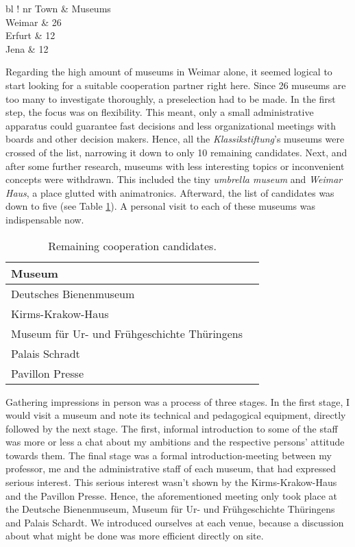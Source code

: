 \begin{table}[h]
	\centering
	\begin{tabular}{ bl !{\vrule width 1pt} nr }
		\rowstyle{\bfseries}
		Town		& Museums \\
		\toprule
		Weimar	& 26 \\ 
		Erfurt 	& 12 \\ 
		Jena 		& 12 \\ 
	\end{tabular}
	\caption{Museums in and around Weimar.}
	\label{tab:museums_amounts}
\end{table}

Regarding the high amount of museums in Weimar alone, it seemed logical to start looking for a suitable cooperation partner right here. Since 26 museums are too many to investigate thoroughly, a preselection had to be made. In the first step, the focus was on flexibility. This meant, only a small administrative apparatus could guarantee fast decisions and less organizational meetings with boards and other decision makers. Hence, all the \textit{Klassikstiftung}'s museums were crossed of the list, narrowing it down to only 10 remaining candidates. Next, and after some further research, museums with less interesting topics or inconvenient concepts were withdrawn. This included the tiny \textit{umbrella museum} and \textit{Weimar Haus}, a place glutted with animatronics. Afterward, the list of candidates was down to five (see Table \ref{tab:museums_finalists}). A personal visit to each of these museums was indispensable now.

\begin{table}[h]
	\centering
	\begin{tabular}{ bl }
		\rowstyle{\bfseries}
		Museum \\
		\toprule
		Deutsches Bienenmuseum \\
		Kirms-Krakow-Haus \\
		Museum für Ur- und Frühgeschichte Thüringens \\ 
		Palais Schradt \\
		Pavillon Presse \\
	\end{tabular}
	\caption{Remaining cooperation candidates.}
	\label{tab:museums_finalists}
\end{table}

Gathering impressions in person was a process of three stages. In the first stage, I would visit a museum and note its technical and pedagogical equipment, directly followed by the next stage. The first, informal introduction to some of the staff was more or less a chat about my ambitions and the respective persons' attitude towards them. The final stage was a formal introduction-meeting between my professor, me and the administrative staff of each museum, that had expressed serious interest. This serious interest wasn't shown by the Kirms-Krakow-Haus and the Pavillon Presse. Hence, the aforementioned meeting only took place at the Deutsche Bienenmuseum, Museum für Ur- und Frühgeschichte Thüringens and Palais Schardt. We introduced ourselves at each venue, because a discussion about what might be done was more efficient directly on site.  


